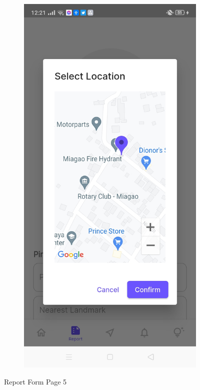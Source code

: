 \begin{figure}[!h]
\begin{subfigure}[c]{0.30\linewidth}
        \centering
        \includegraphics[scale=0.15]{figures/Chapter4/Main/p5-3.jpg}
    \end{subfigure}
    \caption{Report Form Page 5}
    \label{fig:ReportPage5}
\end{figure}

